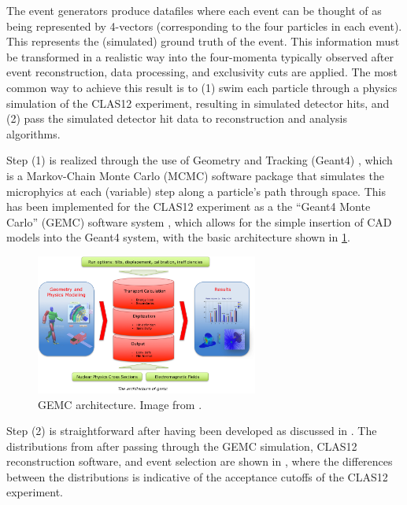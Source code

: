 The event generators produce datafiles where each event can be thought of as being represented by 4-vectors (corresponding to the four particles in each event). This represents the (simulated) ground truth of the event. This information must be transformed in a realistic way into the four-momenta typically observed after event reconstruction, data processing, and exclusivity cuts are applied. The most common way to achieve this result is to (1) swim each particle through a physics simulation of the CLAS12 experiment, resulting in simulated detector hits, and (2) pass the simulated detector hit data to reconstruction and analysis algorithms. 

Step (1) is realized through the use of Geometry and Tracking (Geant4) \parencite{Agostinelli2003Geant4aToolkit}, which is a Markov-Chain Monte Carlo (MCMC) software package that simulates the microphyics at each (variable) step along a particle's path through space. This has been implemented for the CLAS12 experiment as a the ``Geant4 Monte Carlo'' (GEMC) software system \parencite{Ungaro2020TheSimulation}, which allows for the simple insertion of CAD models into the Geant4 system, with the basic architecture shown in \ref{fig:gemc_architecture}. 

\begin{figure}[htb]
    \centering
    \includegraphics[width=0.65\textwidth]{Chapters/Ch3-Simulations/simulation_pipeline/pics/gemc_basics.png}
    \caption[GEMC Architecture]{GEMC architecture. Image from \parencite{Ungaro2020TheSimulation}.}
    \label{fig:gemc_architecture}
\end{figure}

Step (2) is straightforward after having been developed as discussed in . The distributions from  after passing through the GEMC simulation, CLAS12 reconstruction software, and event selection are shown in , where the differences between the distributions is indicative of the acceptance cutoffs of the CLAS12 experiment. 


